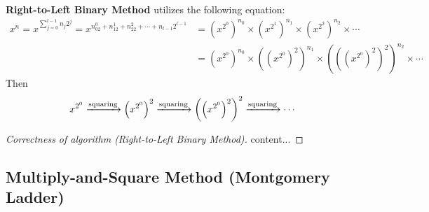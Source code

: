 \documentclass[12pt,openany]{book}
\theoremstyle{definition}
\newcommand{\of}[1]{\left( #1 \right)}
\begin{document}
	\textbf{Right-to-Left Binary Method} utilizes the following equation: \begin{align*}
	x^n=x^{\sum_{j=0}^{l-1}n_j2^j}=x^{n_02^0+n_12^1+n_22^2+\cdots+n_{l-1}2^{l-1}}&=\of{x^{2^0}}^{n_0}\times \of{x^{2^1}}^{n_1}\times \of{x^{2^2}}^{n_2}\times \cdots\\
	&=\of{x^{2^0}}^{n_0}\times \of{\of{x^{2^0}}^2}^{n_1}\times \of{\of{\of{x^{2^0}}^2}^2}^{n_2}\times \cdots
	\end{align*}
	Then \begin{align*}
	x^{2^0}\xrightarrow{\textnormal{squaring}}\of{x^{2^0}}^2\xrightarrow{\textnormal{squaring}}\of{\of{x^{2^0}}^2}^2\xrightarrow{\textnormal{squaring}}\cdots
	\end{align*}
	\begin{proof}[Correctness of algorithm \textnormal{(Right-to-Left Binary Method)}]
		content...
	\end{proof}
	
	\newpage
	\subsection{Multiply-and-Square Method (Montgomery Ladder)}
	
\end{document}
